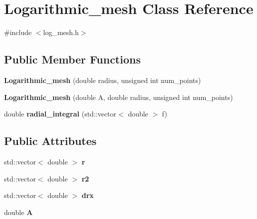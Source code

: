\hypertarget{classLogarithmic__mesh}{}\section{Logarithmic\+\_\+mesh Class Reference}
\label{classLogarithmic__mesh}


{\ttfamily \#include $<$log\+\_\+mesh.\+h$>$}

\subsection*{Public Member Functions}
\begin{DoxyCompactItemize}
\item 
\mbox{\label{classLogarithmic__mesh_ad9294c2de86a826584489ff2b7dd3963}} 
{\bfseries Logarithmic\+\_\+mesh} (double radius, unsigned int num\+\_\+points)
\item 
\mbox{\label{classLogarithmic__mesh_a3c394001d97d86907ef5e9f61dd680ca}} 
{\bfseries Logarithmic\+\_\+mesh} (double A, double radius, unsigned int num\+\_\+points)
\item 
\mbox{\label{classLogarithmic__mesh_aa832cd52424296e6d519313558eb3132}} 
double {\bfseries radial\+\_\+integral} (std\+::vector$<$ double $>$ f)
\end{DoxyCompactItemize}
\subsection*{Public Attributes}
\begin{DoxyCompactItemize}
\item 
\mbox{\label{classLogarithmic__mesh_a78084fd600b2ded00b34b5b8f705f5a4}} 
std\+::vector$<$ double $>$ {\bfseries r}
\item 
\mbox{\label{classLogarithmic__mesh_a297cb20a293a3ba26250b55fad36f88b}} 
std\+::vector$<$ double $>$ {\bfseries r2}
\item 
\mbox{\label{classLogarithmic__mesh_af7e95466d3c76af1c34c6c014569906c}} 
std\+::vector$<$ double $>$ {\bfseries drx}
\item 
\mbox{\label{classLogarithmic__mesh_a879e08e3f2ccc6fe2933110bbe649152}} 
double {\bfseries A}
\end{DoxyCompactItemize}



